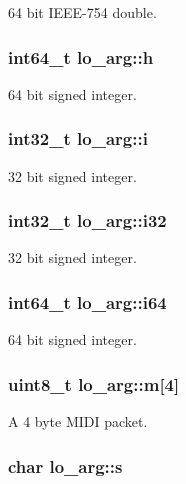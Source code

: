 64 bit \-I\-E\-E\-E-\/754 double. \hypertarget{unionlo__arg_a1773bb0e69aa3b137ddc26044334b2b4}{
\subsubsection[{h}]{\setlength{\rightskip}{0pt plus 5cm}int64\-\_\-t {\bf lo\-\_\-arg\-::h}}}\label{unionlo__arg_a1773bb0e69aa3b137ddc26044334b2b4}
64 bit signed integer. \hypertarget{unionlo__arg_a7eefb9548603ff68b4fbd4c4d41c648b}{
\subsubsection[{i}]{\setlength{\rightskip}{0pt plus 5cm}int32\-\_\-t {\bf lo\-\_\-arg\-::i}}}\label{unionlo__arg_a7eefb9548603ff68b4fbd4c4d41c648b}
32 bit signed integer. \hypertarget{unionlo__arg_a07e800463dc4ec5066b01033457ca018}{
\subsubsection[{i32}]{\setlength{\rightskip}{0pt plus 5cm}int32\-\_\-t {\bf lo\-\_\-arg\-::i32}}}\label{unionlo__arg_a07e800463dc4ec5066b01033457ca018}
32 bit signed integer. \hypertarget{unionlo__arg_afe8046a8395e9af51cc759034ccfedd5}{
\subsubsection[{i64}]{\setlength{\rightskip}{0pt plus 5cm}int64\-\_\-t {\bf lo\-\_\-arg\-::i64}}}\label{unionlo__arg_afe8046a8395e9af51cc759034ccfedd5}
64 bit signed integer. \hypertarget{unionlo__arg_a96d32df951c54eaff5dc67fc97a70c83}{
\subsubsection[{m}]{\setlength{\rightskip}{0pt plus 5cm}uint8\-\_\-t {\bf lo\-\_\-arg\-::m}\mbox{[}4\mbox{]}}}\label{unionlo__arg_a96d32df951c54eaff5dc67fc97a70c83}
\-A 4 byte \-M\-I\-D\-I packet. \hypertarget{unionlo__arg_a15bbcf8284d75ad441b5cde7218548f6}{
\subsubsection[{s}]{\setlength{\rightskip}{0pt plus 5cm}char {\bf lo\-\_\-arg\-::s}}}\label{unionlo__arg_a15bbcf8284d75ad441b5cde7218548f6}
